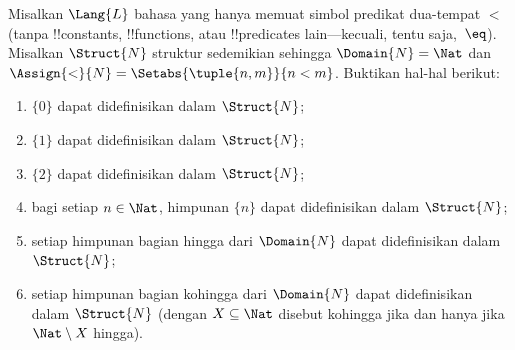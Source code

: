 \documentclass[../../../include/open-logic-section]{subfiles}
\begin{document}
\begin{prob}
Misalkan $\Lang{L}$ bahasa yang hanya memuat simbol predikat dua-tempat $<$
(tanpa !!{constant}s, !!{function}s, atau !!{predicate}s lain---kecuali,
tentu saja,~$\eq$). Misalkan $\Struct{N}$ struktur sedemikian sehingga
$\Domain{N} = \Nat$ dan $\Assign{<}{N} = \Setabs{\tuple{n,m}}{n < m}$.
Buktikan hal-hal berikut:
\begin{enumerate}
\item $\{ 0 \}$ dapat didefinisikan dalam $\Struct{N}$;
\item $\{ 1 \}$ dapat didefinisikan dalam $\Struct{N}$;
\item $\{ 2 \}$ dapat didefinisikan dalam $\Struct{N}$;
\item bagi setiap $n \in \Nat$, himpunan $\{ n \}$ dapat didefinisikan
  dalam $\Struct{N}$;
\item setiap himpunan bagian hingga dari $\Domain{N}$ dapat didefinisikan
  dalam $\Struct{N}$;
\item setiap himpunan bagian kohingga dari $\Domain{N}$ dapat didefinisikan
  dalam $\Struct{N}$ (dengan $X \subseteq \Nat$ disebut kohingga jika dan
  hanya jika $\Nat \setminus X$ hingga).
\end{enumerate}
\end{prob}
\end{document}
